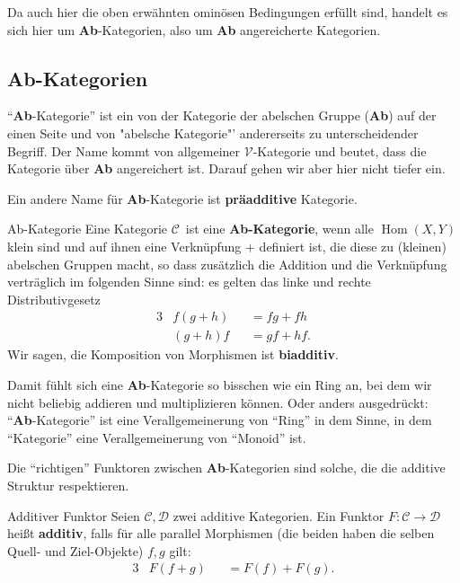 \documentclass[a4paper]{amsart}
\theoremstyle{definition}
\DeclareMathOperator{\Hom}{Hom}
\newcommand{\CC}{\ensuremath{\mathcal{ C }}}
\newcommand{\DD}{\ensuremath{\mathcal{ D }}}
\begin{document}
Da auch hier die oben erwähnten ominösen Bedingungen erfüllt sind, handelt es sich hier um \textbf{Ab}-Kategorien, also um \textbf{Ab} angereicherte Kategorien.

\subsection{Ab-Kategorien}
"`\textbf{Ab}-Kategorie"' ist ein von der Kategorie der abelschen Gruppe (\textbf{Ab}) auf der einen Seite und von "abelsche Kategorie"' andererseits zu unterscheidender Begriff. Der Name kommt von allgemeiner $\mathcal{V}$-Kategorie und beutet, dass die Kategorie über \textbf{Ab} angereichert ist. Darauf gehen wir aber hier nicht tiefer ein.

Ein andere Name für \textbf{Ab}-Kategorie ist \textbf{präadditive} Kategorie. 

\begin{Definition}{Ab-Kategorie}
   Eine Kategorie \CC\ ist eine \textbf{Ab-Kategorie}, wenn alle $\Hom(X, Y)$ klein sind und auf ihnen eine Verknüpfung $+$ definiert ist, die diese zu (kleinen) abelschen Gruppen macht, so dass zusätzlich die Addition und die Verknüpfung verträglich im folgenden Sinne sind: es gelten das linke und rechte Distributivgesetz
   \begin{alignat}{3}
      &f(g+h) &&= fg+fh\\
      &(g+h)f &&= gf+hf.
   \end{alignat}
   Wir sagen, die Komposition von Morphismen ist \textbf{biadditiv}.
\end{Definition}
Damit fühlt sich eine \textbf{Ab}-Kategorie so bisschen wie ein Ring an, bei dem wir nicht beliebig addieren und multiplizieren können. Oder anders ausgedrückt: "`\textbf{Ab}-Kategorie"' ist eine Verallgemeinerung von "`Ring"' in dem Sinne, in dem "`Kategorie"' eine Verallgemeinerung von "`Monoid"' ist.

Die "`richtigen"' Funktoren zwischen \textbf{Ab}-Kategorien sind solche, die die additive Struktur respektieren.
\begin{Definition}{Additiver Funktor}
   Seien $\CC, \DD$ zwei additive Kategorien. Ein Funktor $F \colon \CC \to \DD$ heißt \textbf{additiv}, falls für alle parallel Morphismen (die beiden haben die selben Quell- und Ziel-Objekte) $f,g$ gilt:
   \begin{alignat}{3}
      &F(f+g) &&= F(f)+F(g).
   \end{alignat}
\end{Definition}
\end{document}
